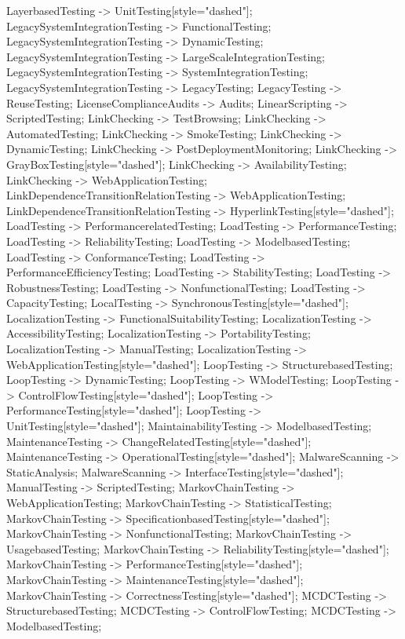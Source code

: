 \documentclass{article}
\begin{document}
{LayerbasedTesting -> UnitTesting[style="dashed"];
LegacySystemIntegrationTesting -> FunctionalTesting;
LegacySystemIntegrationTesting -> DynamicTesting;
LegacySystemIntegrationTesting -> LargeScaleIntegrationTesting;
LegacySystemIntegrationTesting -> SystemIntegrationTesting;
LegacySystemIntegrationTesting -> LegacyTesting;
LegacyTesting -> ReuseTesting;
LicenseComplianceAudits -> Audits;
LinearScripting -> ScriptedTesting;
LinkChecking -> TestBrowsing;
LinkChecking -> AutomatedTesting;
LinkChecking -> SmokeTesting;
LinkChecking -> DynamicTesting;
LinkChecking -> PostDeploymentMonitoring;
LinkChecking -> GrayBoxTesting[style="dashed"];
LinkChecking -> AvailabilityTesting;
LinkChecking -> WebApplicationTesting;
LinkDependenceTransitionRelationTesting -> WebApplicationTesting;
LinkDependenceTransitionRelationTesting -> HyperlinkTesting[style="dashed"];
LoadTesting -> PerformancerelatedTesting;
LoadTesting -> PerformanceTesting;
LoadTesting -> ReliabilityTesting;
LoadTesting -> ModelbasedTesting;
LoadTesting -> ConformanceTesting;
LoadTesting -> PerformanceEfficiencyTesting;
LoadTesting -> StabilityTesting;
LoadTesting -> RobustnessTesting;
LoadTesting -> NonfunctionalTesting;
LoadTesting -> CapacityTesting;
LocalTesting -> SynchronousTesting[style="dashed"];
LocalizationTesting -> FunctionalSuitabilityTesting;
LocalizationTesting -> AccessibilityTesting;
LocalizationTesting -> PortabilityTesting;
LocalizationTesting -> ManualTesting;
LocalizationTesting -> WebApplicationTesting[style="dashed"];
LoopTesting -> StructurebasedTesting;
LoopTesting -> DynamicTesting;
LoopTesting -> WModelTesting;
LoopTesting -> ControlFlowTesting[style="dashed"];
LoopTesting -> PerformanceTesting[style="dashed"];
LoopTesting -> UnitTesting[style="dashed"];
MaintainabilityTesting -> ModelbasedTesting;
MaintenanceTesting -> ChangeRelatedTesting[style="dashed"];
MaintenanceTesting -> OperationalTesting[style="dashed"];
MalwareScanning -> StaticAnalysis;
MalwareScanning -> InterfaceTesting[style="dashed"];
ManualTesting -> ScriptedTesting;
MarkovChainTesting -> WebApplicationTesting;
MarkovChainTesting -> StatisticalTesting;
MarkovChainTesting -> SpecificationbasedTesting[style="dashed"];
MarkovChainTesting -> NonfunctionalTesting;
MarkovChainTesting -> UsagebasedTesting;
MarkovChainTesting -> ReliabilityTesting[style="dashed"];
MarkovChainTesting -> PerformanceTesting[style="dashed"];
MarkovChainTesting -> MaintenanceTesting[style="dashed"];
MarkovChainTesting -> CorrectnessTesting[style="dashed"];
MCDCTesting -> StructurebasedTesting;
MCDCTesting -> ControlFlowTesting;
MCDCTesting -> ModelbasedTesting;
}
\end{document}
